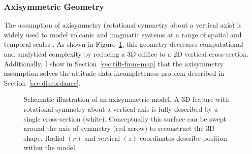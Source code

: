 \subsubsection{Axisymmetric Geometry}


The assumption of axisymmetry (rotational symmetry about a vertical axis) is widely used to model volcanic and magmatic systems at a range of spatial and temporal scales \parencite[c.f.,][]{redmond_numerical_2004,ogawa_four-stage_2021,mogi_relations_1958,mctigue_elastic_1987}. As shown in Figure~\ref{fig:axisymmetry}, this geometry decreases computational and analytical complexity by reducing a 3D edifice to a 2D vertical cross-section. Additionally, I show in Section~\ref{sec:tilt-from-map} that the axisymmetry assumption solves the attitude data incompleteness problem described in Section~\ref{sec:discordance}.

\begin{figure}
    \caption[Axisymmetry]{Schematic illustration of an axisymmetric model. A 3D feature with rotational symmetry about a vertical axis is fully described by a single cross-section (white). Conceptually this surface can be swept around the axis of symmetry (red arrow) to reconstruct the 3D shape. Radial $(r)$ and vertical $(z)$ coordinates describe position within the model.}%
    \label{fig:axisymmetry}
\end{figure}